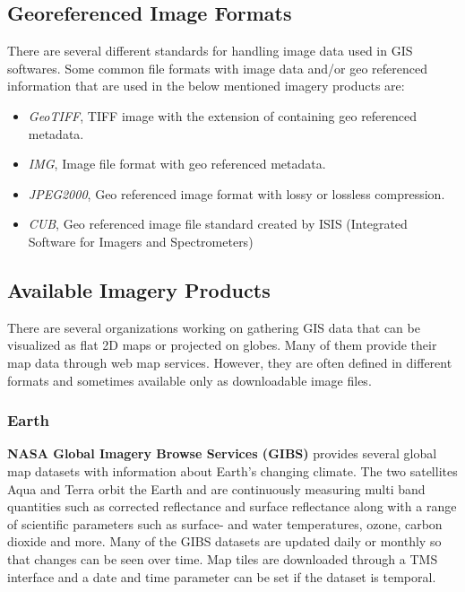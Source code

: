 \subsection{Georeferenced Image Formats}

There are several different standards for handling image data used in GIS softwares. Some common file formats with image data and/or geo referenced information that are used in the below mentioned imagery products are:

\begin{itemize}  
\item \emph{GeoTIFF}, TIFF image with the extension of containing geo referenced metadata. 
\item \emph{IMG}, Image file format with geo referenced metadata. 
\item \emph{JPEG2000}, Geo referenced image format with lossy or lossless compression.
\item \emph{CUB}, Geo referenced image file standard created by ISIS (Integrated Software for Imagers and Spectrometers)
\end{itemize}

\subsection{Available Imagery Products}

There are several organizations working on gathering GIS data that can be visualized as flat 2D maps or projected on globes. Many of them provide their map data through web map services. However, they are often defined in different formats and sometimes available only as downloadable image files.

\subsubsection{Earth}

\textbf{NASA Global Imagery Browse Services (GIBS)} provides several global map datasets with information about Earth's changing climate. The two satellites Aqua and Terra orbit the Earth and are continuously measuring multi band quantities such as corrected reflectance and surface reflectance along with a range of scientific parameters such as surface- and water temperatures, ozone, carbon dioxide and more. Many of the GIBS datasets are updated daily or monthly so that changes can be seen over time. Map tiles are downloaded through a TMS interface and a date and time parameter can be set if the dataset is temporal.

